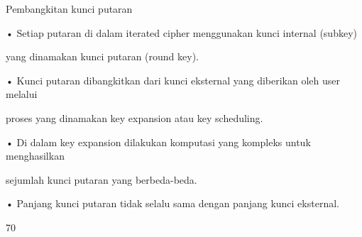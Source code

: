 \documentclass{article}
\begin{document}

Pembangkitan kunci putaran

• Setiap putaran di dalam iterated cipher menggunakan kunci internal (subkey) 

yang dinamakan kunci putaran (round key).

• Kunci putaran dibangkitkan dari kunci eksternal yang diberikan oleh user melalui 

proses yang dinamakan key expansion atau key scheduling.

• Di dalam key expansion dilakukan komputasi yang kompleks untuk menghasilkan 

sejumlah kunci putaran yang berbeda-beda. 

• Panjang kunci putaran tidak selalu sama dengan panjang kunci eksternal.  

70
\end{document}
